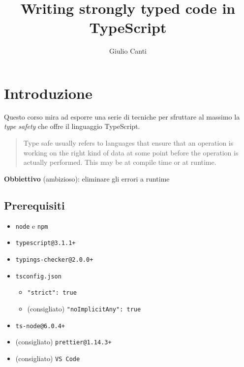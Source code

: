 \documentclass[12pt]{article}
\title{Writing strongly typed code in TypeScript}
\author{Giulio Canti}
\theoremstyle{definition}
\begin{document}
\maketitle

\tableofcontents

\newpage

\section{Introduzione}

Questo corso mira ad esporre una serie di tecniche per sfruttare al massimo la \emph{type safety} che offre il linguaggio TypeScript.

\begin{quote}
Type safe usually refers to languages that ensure that an operation is working on the right kind of data at some point
before the operation is actually performed. This may be at compile time or at runtime.
\end{quote}

\textbf{Obbiettivo} (ambizioso): eliminare gli errori a runtime


\subsection{Prerequisiti}

\begin{itemize}
  \item \texttt{node} e \texttt{npm}
  \item \texttt{typescript@3.1.1+}
  \item \texttt{typings-checker@2.0.0+}
  \item \texttt{tsconfig.json}
    \begin{itemize}
      \item \texttt{"strict": true}
      \item (consigliato) \texttt{"noImplicitAny": true}
    \end{itemize}
  \item \texttt{ts-node@6.0.4+}
  \item (consigliato) \texttt{prettier@1.14.3+}
  \item (consigliato) \texttt{VS Code}
\end{itemize}
\end{document}
